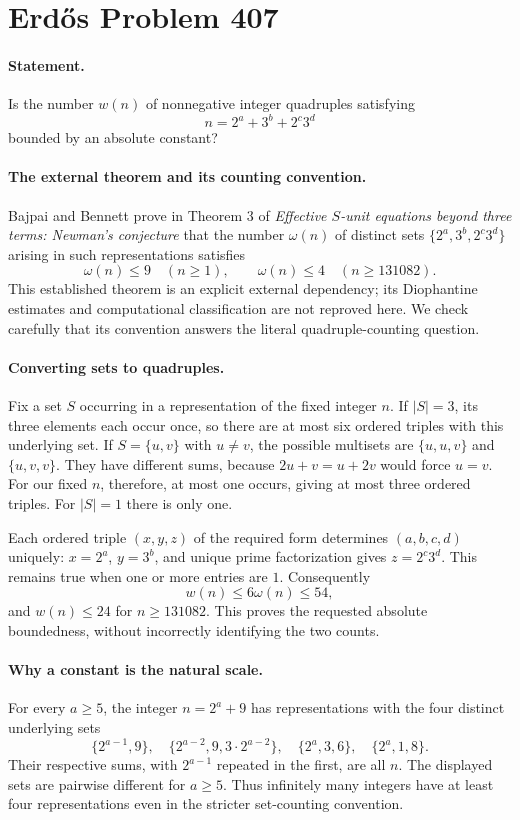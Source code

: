 \section*{Erd\H{o}s Problem 407}

\paragraph{Statement.}
Is the number \(w(n)\) of nonnegative integer quadruples satisfying
\[
 n=2^a+3^b+2^c3^d
\]
bounded by an absolute constant?

\paragraph{The external theorem and its counting convention.}
Bajpai and Bennett prove in Theorem 3 of
\emph{Effective \(S\)-unit equations beyond three terms: Newman's
conjecture} that the number \(\omega(n)\) of distinct sets
\(\{2^a,3^b,2^c3^d\}\) arising in such representations satisfies
\[
 \omega(n)\leq9\quad(n\geq1),\qquad
 \omega(n)\leq4\quad(n\geq131082).
 \tag{1}
\]
This established theorem is an explicit external dependency; its
Diophantine estimates and computational classification are not reproved
here. We check carefully that its convention answers the literal
quadruple-counting question.

\paragraph{Converting sets to quadruples.}
Fix a set \(S\) occurring in a representation of the fixed integer \(n\).
If \(|S|=3\), its three elements each occur once, so there are at most
six ordered triples with this underlying set.
If \(S=\{u,v\}\) with \(u\ne v\), the possible multisets are
\(\{u,u,v\}\) and \(\{u,v,v\}\). They have different sums, because
\(2u+v=u+2v\) would force \(u=v\). For our fixed \(n\), therefore,
at most one occurs, giving at most three ordered triples.
For \(|S|=1\) there is only one.

Each ordered triple \((x,y,z)\) of the required form determines
\((a,b,c,d)\) uniquely: \(x=2^a\), \(y=3^b\), and unique prime
factorization gives \(z=2^c3^d\). This remains true when one or more
entries are \(1\). Consequently
\[
 w(n)\leq6\omega(n)\leq54,
 \tag{2}
\]
and \(w(n)\leq24\) for \(n\geq131082\). This proves the requested
absolute boundedness, without incorrectly identifying the two counts.

\paragraph{Why a constant is the natural scale.}
For every \(a\geq5\), the integer \(n=2^a+9\) has representations with
the four distinct underlying sets
\[
 \{2^{a-1},9\},\quad
 \{2^{a-2},9,3\cdot2^{a-2}\},\quad
 \{2^a,3,6\},\quad
 \{2^a,1,8\}.
\]
Their respective sums, with \(2^{a-1}\) repeated in the first, are all
\(n\). The displayed sets are pairwise different for \(a\geq5\).
Thus infinitely many integers have at least four representations
even in the stricter set-counting convention.

